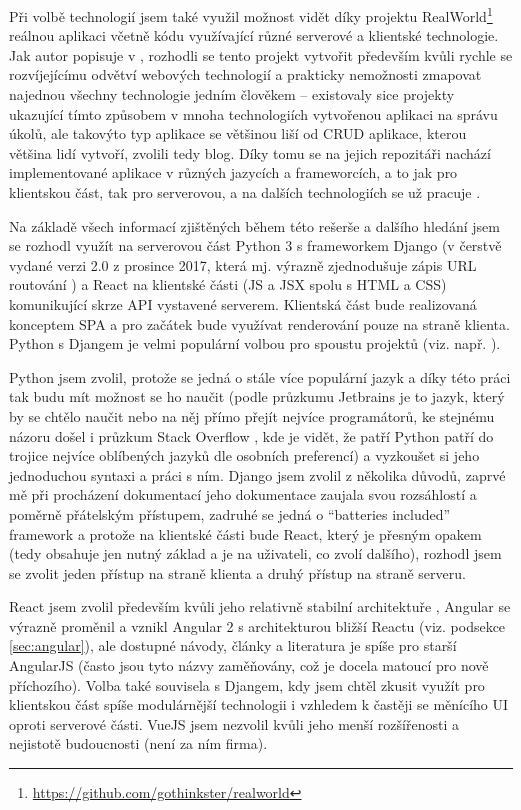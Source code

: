     Při volbě technologií jsem také využil možnost vidět díky projektu RealWorld\footnote{\url{https://github.com/gothinkster/realworld}} reálnou aplikaci včetně kódu využívající různé serverové a klientské technologie. Jak autor popisuje v \cite{realworld}, rozhodli se tento projekt vytvořit především kvůli rychle se rozvíjejícímu odvětví webových technologií a prakticky nemožnosti zmapovat najednou všechny technologie jedním člověkem -- existovaly sice projekty ukazující tímto způsobem v mnoha technologiích vytvořenou aplikaci na správu úkolů, ale takovýto typ aplikace se většinou liší od CRUD aplikace, kterou většina lidí vytvoří, zvolili tedy blog. Díky tomu se na jejich repozitáři nachází implementované aplikace v různých jazycích a frameworcích, a to jak pro klientskou část, tak pro serverovou, a na dalších technologiích se už pracuje \cite{realworld-git}.
    
    Na základě všech informací zjištěných během této rešerše a dalšího hledání jsem se rozhodl využít na serverovou část Python 3 s frameworkem Django (v čerstvě vydané verzi 2.0 z prosince 2017, která mj. výrazně zjednodušuje zápis URL routování \cite{django2}) a React na klientské části (JS a JSX spolu s HTML a CSS) komunikující skrze API vystavené serverem. Klientská část bude realizovaná konceptem SPA a pro začátek bude využívat renderování pouze na straně klienta. Python s Djangem je velmi populární volbou pro spoustu projektů (viz. např. \cite{stack-stats18}).
    
    Python jsem zvolil, protože se jedná o stále více populární jazyk a díky této práci tak budu mít možnost se ho naučit (podle průzkumu Jetbrains \cite{jetbrains-stats} je to jazyk, který by se chtělo naučit nebo na něj přímo přejít nejvíce programátorů, ke stejnému názoru došel i průzkum Stack Overflow \cite{stack-stats18}, kde je vidět, že patří Python patří do trojice nejvíce oblíbených jazyků dle osobních preferencí) a vyzkoušet si jeho jednoduchou syntaxi a práci s ním. Django jsem zvolil z několika důvodů, zaprvé mě při procházení dokumentací jeho dokumentace zaujala svou rozsáhlostí a poměrně přátelským přístupem, zadruhé se jedná o \enquote{batteries included} framework a protože na klientské části bude React, který je přesným opakem (tedy obsahuje jen nutný základ a je na uživateli, co zvolí dalšího), rozhodl jsem se zvolit jeden přístup na straně klienta a druhý přístup na straně serveru.
    
    React jsem zvolil především kvůli jeho relativně stabilní architektuře \cite{js-fw2}, Angular se výrazně proměnil a vznikl Angular 2 s architekturou bližší Reactu (viz. podsekce \ref{sec:angular}), ale dostupné návody, články a literatura je spíše pro starší AngularJS (často jsou tyto názvy zaměňovány, což je docela matoucí pro nově příchozího). Volba také souvisela s Djangem, kdy jsem chtěl zkusit využít pro klientskou část spíše modulárnější technologii i vzhledem k častěji se měnícího UI oproti serverové části. VueJS jsem nezvolil kvůli jeho menší rozšířenosti a nejistotě budoucnosti (není za ním firma).
    
